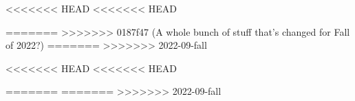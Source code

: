 \documentclass{../../oss-apphys-exam}
\begin{document}
\begin{multicols*}{2}
<<<<<<< HEAD
<<<<<<< HEAD

%  
%  
=======
>>>>>>> 0187f47 (A whole bunch of stuff that's changed for Fall of 2022?)
=======
>>>>>>> 2022-09-fall
  \begin{questions}
%    
%
<<<<<<< HEAD
<<<<<<< HEAD
  
=======
=======
>>>>>>> 2022-09-fall
    

\end{questions}
\end{multicols*}
\end{document}
